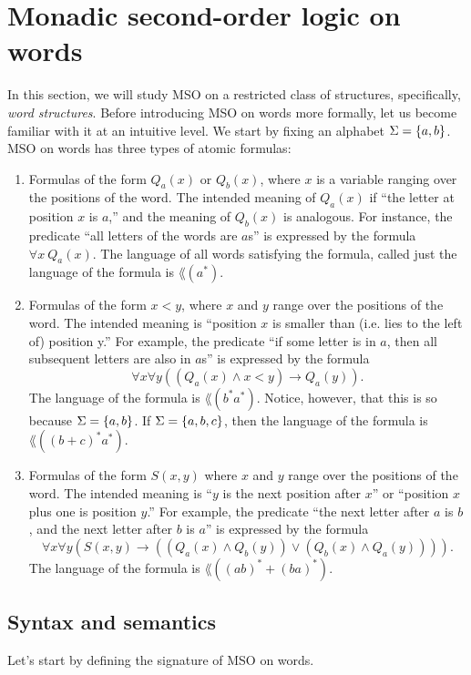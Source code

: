 \documentclass[11pt,twoside=off,numbers=noenddot]{scrbook}
\begin{document}
\section{Monadic second-order logic on words}
In this section, we will study MSO on a restricted class of
structures, specifically, \emph{word structures}. Before introducing
MSO on words more formally, let us become familiar with it at an
intuitive level. We start by fixing an alphabet $\Sigma = \{ a,
b \}$. MSO on words has three types of atomic formulas:
\begin{enumerate}
  \item Formulas of the form $Q_a(x)$ or $Q_b(x)$, where $x$ is a
    variable ranging over the positions of the word. The intended
    meaning of $Q_a(x)$ if ``the letter at position $x$ is $a$,'' and
    the meaning of $Q_b(x)$ is analogous. For instance, the predicate
    ``all letters of the words are $a$s'' is expressed by the formula
    $\forall x \ Q_a(x)$. The language of all words satisfying the
    formula, called just the language of the formula is $\lang(a^\ast)$.
  \item Formulas of the form $x < y$, where $x$ and $y$ range over
    the positions of the word. The intended meaning is ``position $x$
    is smaller than (i.e. lies to the left of) position y.'' For
    example, the predicate ``if some letter is in $a$, then all
    subsequent letters are also in $a$s'' is expressed by the formula
    \[ \forall x \forall y ((Q_a(x) \wedge x < y) \rightarrow Q_a(y)). \]
    The language of the formula is $\lang(b^\ast a^\ast)$. Notice,
    however, that this is so because $\Sigma = \{ a, b \}$. If
    $\Sigma = \{ a, b, c \}$, then the language of the formula is
    $\lang((b + c)^\ast a^\ast)$.
  \item Formulas of the form $S(x, y)$ where $x$ and $y$ range over
    the positions of the word. The intended meaning is ``$y$ is the
    next position after $x$'' or ``position $x$ plus one is position
    $y$.'' For example, the predicate ``the next letter after $a$ is
    $b$, and the next letter after $b$ is $a$'' is expressed by the formula
    \[ \forall x \forall y (S(x, y) \rightarrow ((Q_a(x) \wedge
    Q_b(y)) \vee (Q_b(x) \wedge Q_a(y)))). \]
    The language of the formula is $\lang((ab)^\ast + (ba)^\ast)$.
\end{enumerate}

\subsection{Syntax and semantics}
Let's start by defining the signature of MSO on words.
\end{document}
